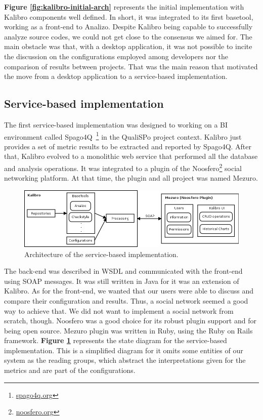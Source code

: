 \textbf{Figure \ref{fig:kalibro-initial-arch}} represents the initial
implementation with Kalibro components well defined. In short, it was
integrated to its first basetool, working as a front-end to Analizo. Despite
Kalibro being capable to successfully analyze source codes, we could not get
close to the consensus we aimed for. The main obstacle was that, with a desktop
application, it was not possible to incite the discussion on the configurations
employed among developers nor the comparison of results between projects. That
was the main reason that motivated the move from a desktop application to a
service-based implementation.

\subsection{Service-based implementation}
\label{subsec:service-based-implementation}

The first service-based implementation was designed to working on a BI
environment called Spago4Q~\footnote{\url{spago4q.org}} in the QualiSPo project
context. Kalibro just provides a set of metric results to be extracted and
reported by Spago4Q.
%
After that, Kalibro evolved to a monolithic web service that performed all the
database and analysis operations. It was integrated to a plugin of the
Noosfero\footnote{\url{noosfero.org}} social networking platform. At that time,
the plugin and all project was named Mezuro.

\begin{figure}[htb]
  \centering
  \includegraphics[width=\textwidth]{images/mezuro-noosfero-arch.png}
  \caption{Architecture of the service-based implementation.}
  \label{fig:mezuro-noosfero-arch}
\end{figure}


The back-end was described in WSDL and communicated with the front-end using
SOAP messages.  It was still written in Java for it was an extension of
Kalibro. As for the front-end, we wanted that our users were able to discuss
and compare their configuration and results. Thus, a social network seemed a
good way to achieve that. We did not want to implement a social network from
scratch, though.  Noosfero was a good choice for its robust plugin support and
for being open source. Mezuro plugin was written in Ruby, using the Ruby on
Rails framework. \textbf{Figure \ref{fig:mezuro-noosfero-arch}} represents the
state diagram for the service-based implementation. This is a simplified
diagram for it omits some entities of our system as the reading groups, which
abstract the interpretations given for the metrics and are part of the
configurations.


